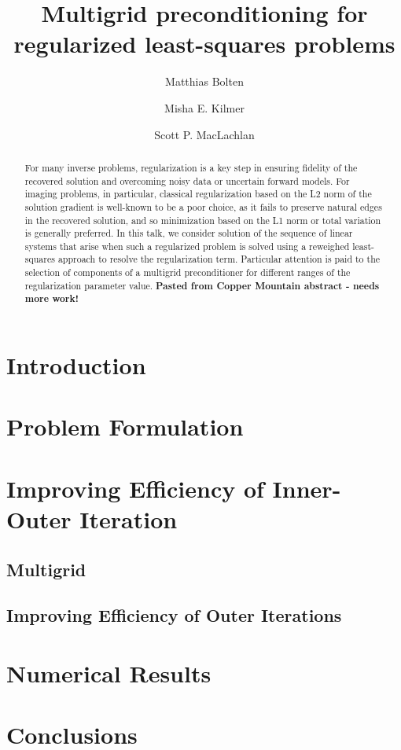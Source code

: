 \documentclass[review]{siamart190516}
\title{Multigrid preconditioning for regularized least-squares problems}
\author{Matthias Bolten \and Misha E. Kilmer \and Scott P. MacLachlan}
\begin{document}
\maketitle

\begin{abstract}
For many inverse problems, regularization is a key step in ensuring
fidelity of the recovered solution and overcoming noisy data or
uncertain forward models. For imaging problems, in particular,
classical regularization based on the L2 norm of the solution gradient
is well-known to be a poor choice, as it fails to preserve natural
edges in the recovered solution, and so minimization based on the L1
norm or total variation is generally preferred. In this talk, we
consider solution of the sequence of linear systems that arise when
such a regularized problem is solved using a reweighed least-squares
approach to resolve the regularization term. Particular attention is
paid to the selection of components of a multigrid preconditioner for
different ranges of the regularization parameter value.  {\bf Pasted
  from Copper Mountain abstract - needs more work!}
\end{abstract}


\section{Introduction}


\section{Problem Formulation}


\section{Improving Efficiency of Inner-Outer Iteration}


\subsection{Multigrid}\label{sec:multigrid}


\subsection{Improving Efficiency of Outer Iterations}



\section{Numerical Results}\label{sec:numerical}


\section{Conclusions}

 
\end{document}
